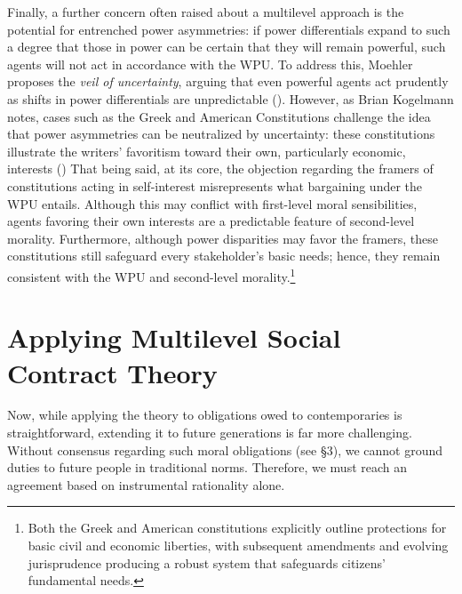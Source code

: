 Finally, a further concern often raised about a multilevel approach is the potential for entrenched power asymmetries: if power differentials expand to such a degree that those in power can be certain that they will remain powerful, such agents will not act in accordance with the WPU. To address this, Moehler proposes the \emph{veil of uncertainty}, arguing that even powerful agents act prudently as shifts in power differentials are unpredictable (\cite[p.\ 144]{moehler2018minimal}). However, as Brian Kogelmann notes, cases such as the Greek and American Constitutions challenge the idea that power asymmetries can be neutralized by uncertainty: these constitutions illustrate the writers’ favoritism toward their own, particularly economic, interests (\cite[p.\ 5–6]{kogelmann2019}) That being said, at its core, the objection regarding the framers of constitutions acting in self-interest misrepresents what bargaining under the WPU entails. Although this may conflict with first-level moral sensibilities, agents favoring their own interests are a predictable feature of second-level morality. Furthermore, although power disparities may favor the framers, these constitutions still safeguard every stakeholder’s basic needs; hence, they remain consistent with the WPU and second-level morality.\footnote{Both the Greek and American constitutions explicitly outline protections for basic civil and economic liberties, with subsequent amendments and evolving jurisprudence producing a robust system that safeguards citizens' fundamental needs.}

\section{Applying Multilevel Social Contract Theory}

Now, while applying the theory to obligations owed to contemporaries is straightforward, extending it to future generations is far more challenging. Without consensus regarding such moral obligations (see §3), we cannot ground duties to future people in traditional norms. Therefore, we must reach an agreement based on instrumental rationality alone.

